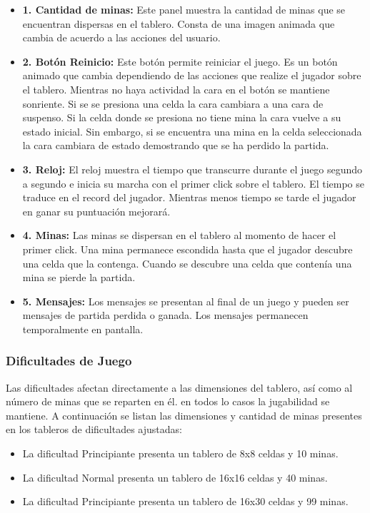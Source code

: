 \documentclass[11pt]{article} %
\begin{document}
\begin{itemize}

\item \textbf{1. Cantidad de minas:} Este panel muestra la cantidad de minas que se encuentran dispersas en el tablero. Consta de una imagen animada que cambia de acuerdo a las acciones del usuario.
\item \textbf{2. Bot\'on Reinicio:} Este bot\'on permite reiniciar el juego. Es un bot\'on animado que cambia dependiendo de las acciones que realize el jugador sobre el tablero. Mientras no haya actividad la cara en el bot\'on se mantiene sonriente. Si se se presiona una celda la cara cambiara a una cara de suspenso. Si la celda donde se presiona no tiene mina la cara vuelve a su estado inicial. Sin embargo, si se encuentra una mina en la celda seleccionada la cara cambiara de estado demostrando que se ha perdido la partida.
\item \textbf{3. Reloj:} El reloj muestra el tiempo que transcurre durante el juego segundo a segundo e inicia su marcha con el primer click sobre el tablero. El tiempo se traduce en el record del jugador. Mientras menos tiempo se tarde el jugador en ganar su puntuaci\'on mejorar\'a.
\item \textbf{4. Minas:} Las minas se dispersan en el tablero al momento de hacer el primer click. Una mina permanece escondida hasta que el jugador descubre una celda que la contenga. Cuando se descubre una celda que conten\'ia una mina se pierde la partida.
\item \textbf{5. Mensajes:} Los mensajes se presentan al final de un juego y pueden ser mensajes de partida perdida o ganada. Los mensajes permanecen temporalmente en pantalla.

\end{itemize}

\subsubsection{\textbf{Dificultades de Juego}}

Las dificultades afectan directamente a las dimensiones del tablero, as\'i como al n\'umero de minas que se reparten en \'el. en todos lo casos la jugabilidad se mantiene. A continuaci\'on se listan las dimensiones y cantidad de minas presentes en los tableros de dificultades ajustadas:

\begin{itemize}
\item La dificultad Principiante presenta un tablero de 8x8 celdas y 10 minas.
\item La dificultad Normal presenta un tablero de 16x16 celdas y 40 minas.
\item La dificultad Principiante presenta un tablero de 16x30 celdas y 99 minas.
\end{itemize}
\end{document}
